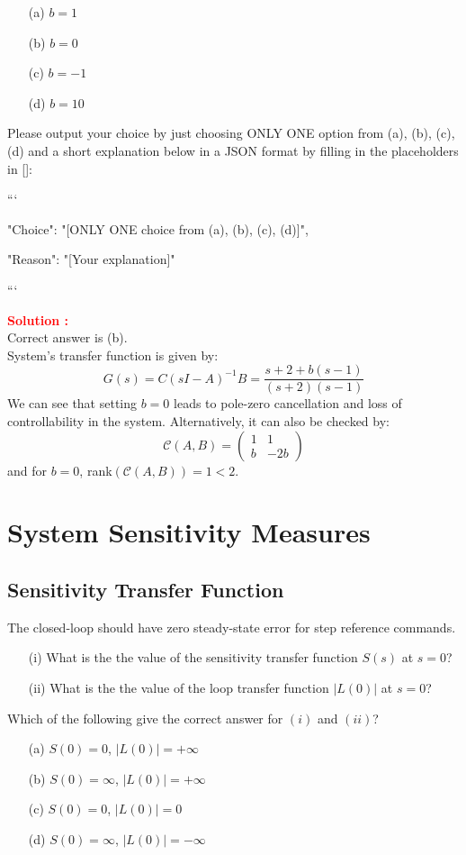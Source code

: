 \documentclass[12pt]{article}
\newcommand{\pmat}[1]{\begin{pmatrix} #1 \end{pmatrix}}
\begin{document}
\begin{itemize}
    \item[(a)] $b=1$
    \item[(b)] $b=0$
    \item[(c)] $b=-1$
    \item[(d)] $b=10$
\end{itemize}


Please output your choice by just choosing ONLY ONE option from (a), (b), (c), (d) and a short explanation below in a JSON format by filling in the placeholders in []:

```
{

"Choice": "[ONLY ONE choice from (a), (b), (c), (d)]",

"Reason": "[Your explanation]"

}

```


\textbf{\textcolor{red}{Solution :}} \\
Correct answer is (b).\\
System's transfer function is given by:
$$G(s) = C(sI - A)^{-1}B= \frac{s + 2 + b(s - 1)}{(s+2)(s-1)}$$
We can see that setting $b=0$ leads to pole-zero cancellation and loss of controllability in the system. Alternatively, it can also be checked by:
$$\mathcal{C}(A,B)=\pmat{1 & 1\\ b & -2b}$$
and for $b = 0$, rank$(\mathcal{C}(A, B)) = 1 <2$.
\clearpage

\section{System Sensitivity Measures}
\subsection{Sensitivity Transfer Function}

The closed-loop should have zero steady-state error for step reference commands. 

\begin{itemize}
    \item[(i)] What is the the value of the sensitivity transfer function $S(s)$ at $s= 0$?
    \item[(ii)] What is the the value of the loop transfer function $|L(0)|$ at $s= 0$?
    \end{itemize}

Which of the following give the correct answer for $(i)$ and $(ii)$?

\begin{itemize}
    \item[(a)] $S(0) = 0$, $|L(0)| = +\infty$
    \item[(b)] $S(0) = \infty$, $|L(0)| = +\infty$
    \item[(c)] $S(0) = 0$, $|L(0)| = 0$
    \item[(d)] $S(0) = \infty$, $|L(0)| = -\infty$
\end{itemize}
\end{document}
